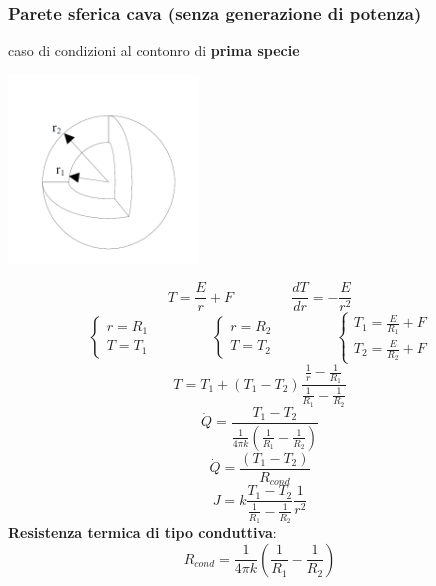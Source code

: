 \subsubsection{Parete sferica cava (senza generazione di potenza)}
caso di condizioni al contonro di \textbf{prima specie}
\begin{center}
    \includegraphics[height=5cm]{../L10/img11.PNG}
\end{center}
\[
    T = \frac{E}{r} + F \;\;\;\;\;\;\;\;\;\;\;\;\;\;\;\frac{dT}{dr} = - \frac{E}{r^2}
\]
\[
    \begin{cases}
        r = R_1 \\ T= T_1
    \end{cases} \;\;\;\;\;\;\;\;\;\;\;\;\;\;\;\begin{cases}
        r=R_2 \\ T=T_2
    \end{cases} \;\;\;\;\;\;\;\;\;\;\;\;\;\;\; \begin{cases}
        T_1 = \frac{E}{R_1} + F \\ T_2 = \frac{E}{R_2}+ F
    \end{cases}
\]
\[
    T= T_1 + (T_1-T_2) \frac{\frac{1}{r} - \frac{1}{R_1}}{\frac{1}{R_1} - \frac{1}{R_2}}
\]
\[
    \dot{Q} = \frac{T_1-T_2}{\frac{1}{4 \pi k} \left( \frac{1}{R_1}- \frac{1}{R_2} \right)}
\]
\[
    \dot{Q}= \frac{(T_1-T_2)}{R_{cond}}
\]
\[
    J = k \frac{T_1-T_2}{\frac{1}{R_1}- \frac{1}{R_2}} \frac{1}{r^2}
\]
\textbf{Resistenza termica di tipo conduttiva}:
\[
    R_{cond} = \frac{1}{4\pi k} \left( \frac{1}{R_1} - \frac{1}{R_2} \right)
\]

